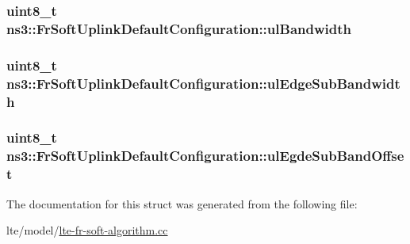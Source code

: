 \subsubsection[{\texorpdfstring{ul\+Bandwidth}{ulBandwidth}}]{\setlength{\rightskip}{0pt plus 5cm}uint8\+\_\+t ns3\+::\+Fr\+Soft\+Uplink\+Default\+Configuration\+::ul\+Bandwidth}\hypertarget{structns3_1_1FrSoftUplinkDefaultConfiguration_afff1a486f03f1846f2cb0d6460113339}{}\label{structns3_1_1FrSoftUplinkDefaultConfiguration_afff1a486f03f1846f2cb0d6460113339}
\subsubsection[{\texorpdfstring{ul\+Edge\+Sub\+Bandwidth}{ulEdgeSubBandwidth}}]{\setlength{\rightskip}{0pt plus 5cm}uint8\+\_\+t ns3\+::\+Fr\+Soft\+Uplink\+Default\+Configuration\+::ul\+Edge\+Sub\+Bandwidth}\hypertarget{structns3_1_1FrSoftUplinkDefaultConfiguration_a9a9a3081265e07a57ae0a8aa0c66f8d0}{}\label{structns3_1_1FrSoftUplinkDefaultConfiguration_a9a9a3081265e07a57ae0a8aa0c66f8d0}
\subsubsection[{\texorpdfstring{ul\+Egde\+Sub\+Band\+Offset}{ulEgdeSubBandOffset}}]{\setlength{\rightskip}{0pt plus 5cm}uint8\+\_\+t ns3\+::\+Fr\+Soft\+Uplink\+Default\+Configuration\+::ul\+Egde\+Sub\+Band\+Offset}\hypertarget{structns3_1_1FrSoftUplinkDefaultConfiguration_a30c213b4f59caf0cefcecbb7528bf100}{}\label{structns3_1_1FrSoftUplinkDefaultConfiguration_a30c213b4f59caf0cefcecbb7528bf100}


The documentation for this struct was generated from the following file\+:\begin{DoxyCompactItemize}
\item 
lte/model/\hyperlink{lte-fr-soft-algorithm_8cc}{lte-\/fr-\/soft-\/algorithm.\+cc}\end{DoxyCompactItemize}
